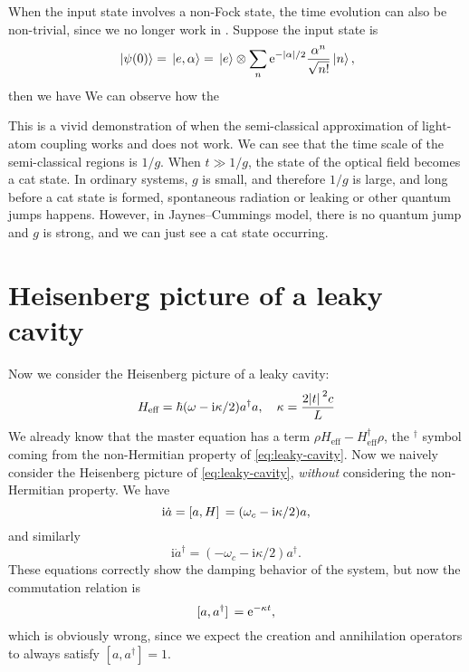 \documentclass[hyperref, a4paper]{article}
\newcommand*{\ii}{\mathrm{i}}
\newcommand*{\ee}{\mathrm{e}}
\begin{document}
When the input state involves a non-Fock state, the time evolution can also be non-trivial, since we no longer 
work in . Suppose the input state is 
\begin{equation}
    \ket*{\psi(0)} = \ket*{e, \alpha} = \ket*{e} \otimes \sum_{n} \ee^{- \abs*{\alpha} / 2} \frac{\alpha^n}{\sqrt{n!}} \ket*{n},
\end{equation}
then we have 
We can observe how the 

This is a vivid demonstration of when the semi-classical approximation of light-atom coupling works and does not 
work. We can see that the time scale of the semi-classical regions is $1 / g$. When $t \gg 1 / g$, the state of 
the optical field becomes a cat state. In ordinary systems, $g$ is small, and therefore $1/g$ is large, and long 
before a cat state is formed, spontaneous radiation or leaking or other quantum jumps happens. However, 
in Jaynes–Cummings model, there is no quantum jump and $g$ is strong, and we can just see a cat state occurring. 

\section{Heisenberg picture of a leaky cavity}

Now we consider the Heisenberg picture of a leaky cavity:
\begin{equation}
    H_\text{eff} = \hbar (\omega - \ii \kappa / 2) a^\dagger a, \quad \kappa = \frac{2\abs*{t}^2 c}{L}
    \label{eq:leaky-cavity}
\end{equation}
We already know that the master equation has a term $\rho H_\text{eff} - H_\text{eff}^\dagger \rho$, 
the $^\dagger$ symbol coming from the non-Hermitian property of \eqref{eq:leaky-cavity}. 
Now we naively consider the Heisenberg picture of \eqref{eq:leaky-cavity}, \emph{without} considering 
the non-Hermitian property. We have 
\[
    \ii \dot{a} = \comm*{a}{H} = (\omega_c - \ii \kappa / 2) a, 
\]
and similarly 
\[
    \ii \dot{a}^\dagger = (- \omega_c - \ii \kappa / 2) a^\dagger.
\]
These equations correctly show the damping behavior of the system, but now the commutation relation is 
\[
    \comm*{a}{a^\dagger} = \ee^{- \kappa t},
\]
which is obviously wrong, since we expect the creation and annihilation operators to always satisfy 
$[a, a^\dagger] = 1$. 
\end{document}
